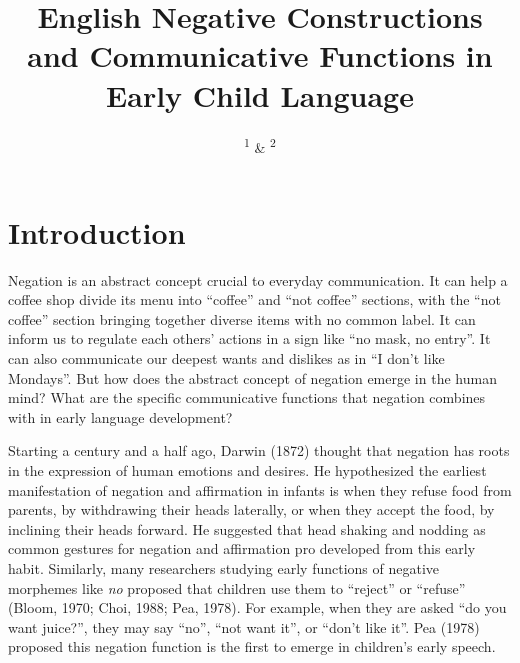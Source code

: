 \documentclass[
  english,
  man,floatsintext]{apa6}
\title{English Negative Constructions and Communicative Functions in Early Child Language}
\author{\textsuperscript{1} \& \textsuperscript{2}}
\date{}
\affiliation{\vspace{0.5cm}\textsuperscript{1} \\\textsuperscript{2} }
\begin{document}
\maketitle

\hypertarget{introduction}{%
\section{Introduction}\label{introduction}}

Negation is an abstract concept crucial to everyday communication. It can help a coffee shop divide its menu into \enquote{coffee} and \enquote{not coffee} sections, with the \enquote{not coffee} section bringing together diverse items with no common label. It can inform us to regulate each others' actions in a sign like \enquote{no mask, no entry}. It can also communicate our deepest wants and dislikes as in \enquote{I don't like Mondays}. But how does the abstract concept of negation emerge in the human mind? What are the specific communicative functions that negation combines with in early language development?

Starting a century and a half ago, Darwin (1872) thought that negation has roots in the expression of human emotions and desires. He hypothesized the earliest manifestation of negation and affirmation in infants is when they refuse food from parents, by withdrawing their heads laterally, or when they accept the food, by inclining their heads forward. He suggested that head shaking and nodding as common gestures for negation and affirmation pro developed from this early habit. Similarly, many researchers studying early functions of negative morphemes like \emph{no} proposed that children use them to \enquote{reject} or \enquote{refuse} (Bloom, 1970; Choi, 1988; Pea, 1978). For example, when they are asked \enquote{do you want juice?}, they may say \enquote{no}, \enquote{not want it}, or \enquote{don't like it}. Pea (1978) proposed this negation function is the first to emerge in children's early speech.
\end{document}
